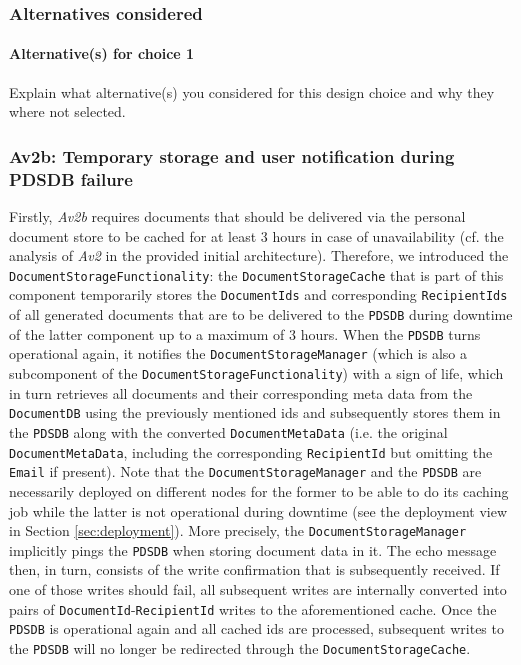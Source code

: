 \documentclass[a4paper,10pt]{article}
\begin{document}
\subsubsection*{Alternatives considered}
\paragraph{Alternative(s) for choice 1} Explain what alternative(s) you
considered for this design choice and why they where not selected.

\subsubsection{Av2b\@: Temporary storage and user notification during PDSDB failure}\label{subsubsec:Av2b}
Firstly, \textit{Av2b} requires documents that should be delivered via the personal document store to be cached for at least 3 hours in case of unavailability (cf. the analysis of \textit{Av2} in the provided initial architecture). Therefore, we introduced the \texttt{DocumentStorageFunctionality}: the \texttt{DocumentStorageCache} that is part of this component temporarily stores the \texttt{DocumentIds} and corresponding \texttt{RecipientIds} of all generated documents that are to be delivered to the \texttt{PDSDB} during downtime of the latter component up to a maximum of 3 hours. When the \texttt{PDSDB} turns operational again, it notifies the \texttt{DocumentStorageManager} (which is also a subcomponent of the \texttt{DocumentStorageFunctionality}) with a sign of life, which in turn retrieves all documents and their corresponding meta data from the \texttt{DocumentDB} using the previously mentioned ids and subsequently stores them in the \texttt{PDSDB} along with the converted \texttt{DocumentMetaData} (i.e. the original \texttt{DocumentMetaData}, including the corresponding \texttt{RecipientId} but omitting the \texttt{Email} if present). Note that the \texttt{DocumentStorageManager} and the \texttt{PDSDB} are necessarily deployed on different nodes for the former to be able to do its caching job while the latter is not operational during downtime (see the deployment view in Section \ref{sec:deployment}). More precisely, the \texttt{DocumentStorageManager} implicitly pings the \texttt{PDSDB} when storing document data in it. The echo message then, in turn, consists of the write confirmation that is subsequently received. If one of those writes should fail, all subsequent writes are internally converted into pairs of \texttt{DocumentId}-\texttt{RecipientId} writes to the aforementioned cache. Once the \texttt{PDSDB} is operational again and all cached ids are processed, subsequent writes to the \texttt{PDSDB} will no longer be redirected through the \texttt{DocumentStorageCache}.\\
\end{document}
